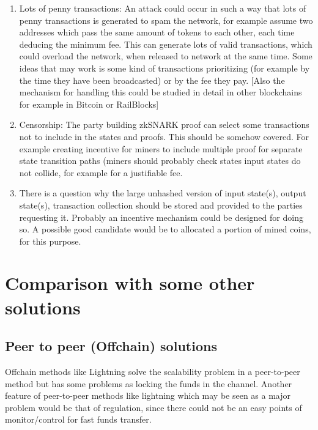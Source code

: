 \documentclass{article}
\begin{document}
\begin{enumerate}
\item Lots of penny transactions: An attack could occur in such a way that lots of penny transactions is generated to spam the network, for example assume two addresses which pass the same amount of tokens to each other, each time deducing the minimum fee. This can generate lots of valid transactions, which could overload the network, when released to network at the same time. Some ideas that may work is some kind of transactions prioritizing (for example by the time they have been broadcasted) or by the fee they pay. [Also the mechanism for handling this could be studied in detail in other blockchains for example in Bitcoin or RailBlocks]

\item Censorship: The party building zkSNARK proof can select some transactions not to include in the states and proofs. This should be somehow covered.  For example creating incentive for miners to include multiple proof for separate state transition paths (miners should probably check states input states do not collide, for example for a justifiable fee.

\item There is a question why the large unhashed version of input state(s), output state(s), transaction collection should be stored and provided to the parties requesting it. Probably an incentive mechanism could be designed for doing so. A possible good candidate would be to allocated a portion of mined coins, for this purpose.

\end{enumerate}

\section{Comparison with some other solutions}

\subsection{Peer to peer (Offchain) solutions}

Offchain methods like Lightning solve the scalability problem in a peer-to-peer method but has some problems as locking the funds in the channel. Another feature of peer-to-peer methods like lightning which may be seen as a major problem would be that of regulation, since there could not be an easy points of monitor/control for fast funds transfer.
\end{document}
